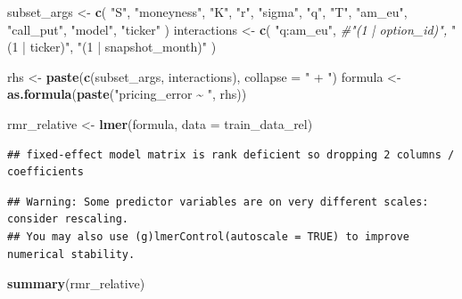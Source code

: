 \documentclass[
]{article}
\newenvironment{Shaded}{\begin{snugshade}}{\end{snugshade}}
\newcommand{\AttributeTok}[1]{\textcolor[rgb]{0.13,0.29,0.53}{#1}}
\newcommand{\CommentTok}[1]{\textcolor[rgb]{0.56,0.35,0.01}{\textit{#1}}}
\newcommand{\FunctionTok}[1]{\textcolor[rgb]{0.13,0.29,0.53}{\textbf{#1}}}
\newcommand{\NormalTok}[1]{#1}
\newcommand{\OtherTok}[1]{\textcolor[rgb]{0.56,0.35,0.01}{#1}}
\newcommand{\StringTok}[1]{\textcolor[rgb]{0.31,0.60,0.02}{#1}}
\begin{document}
\begin{Shaded}
\begin{Highlighting}[]
\NormalTok{subset\_args }\OtherTok{\textless{}{-}} \FunctionTok{c}\NormalTok{(}
  \StringTok{"S"}\NormalTok{,}
  \StringTok{"moneyness"}\NormalTok{,}
  \StringTok{"K"}\NormalTok{,}
  \StringTok{"r"}\NormalTok{,}
  \StringTok{"sigma"}\NormalTok{,}
  \StringTok{"q"}\NormalTok{,}
  \StringTok{"T"}\NormalTok{,}
  \StringTok{"am\_eu"}\NormalTok{,}
  \StringTok{"call\_put"}\NormalTok{,}
  \StringTok{"model"}\NormalTok{,}
  \StringTok{"ticker"}
\NormalTok{  )}
\NormalTok{interactions }\OtherTok{\textless{}{-}} \FunctionTok{c}\NormalTok{(}
  \StringTok{"q:am\_eu"}\NormalTok{,}
  \CommentTok{\#"(1 | option\_id)",}
  \StringTok{"(1 | ticker)"}\NormalTok{,}
  \StringTok{"(1 | snapshot\_month)"}
\NormalTok{)}

\NormalTok{rhs }\OtherTok{\textless{}{-}} \FunctionTok{paste}\NormalTok{(}\FunctionTok{c}\NormalTok{(subset\_args, interactions), }\AttributeTok{collapse =} \StringTok{" + "}\NormalTok{)}
\NormalTok{formula }\OtherTok{\textless{}{-}} \FunctionTok{as.formula}\NormalTok{(}\FunctionTok{paste}\NormalTok{(}\StringTok{"pricing\_error \textasciitilde{} "}\NormalTok{, rhs))}

\NormalTok{rmr\_relative }\OtherTok{\textless{}{-}} \FunctionTok{lmer}\NormalTok{(formula, }\AttributeTok{data =}\NormalTok{ train\_data\_rel)}
\end{Highlighting}
\end{Shaded}

\begin{verbatim}
## fixed-effect model matrix is rank deficient so dropping 2 columns / coefficients
\end{verbatim}

\begin{verbatim}
## Warning: Some predictor variables are on very different scales: consider rescaling. 
## You may also use (g)lmerControl(autoscale = TRUE) to improve numerical stability.
\end{verbatim}

\begin{Shaded}
\begin{Highlighting}[]
\FunctionTok{summary}\NormalTok{(rmr\_relative)}
\end{Highlighting}
\end{Shaded}
\end{document}
